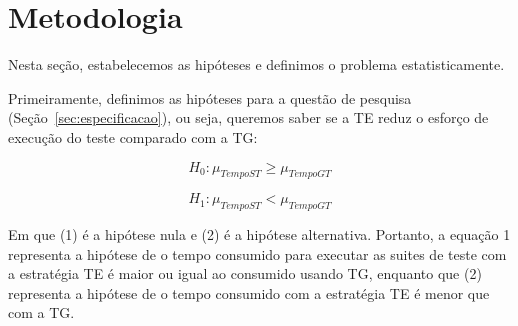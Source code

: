 \section{Metodologia}
\label{sec:metodologia}




Nesta seção, estabelecemos as hipóteses e definimos o problema estatisticamente.

Primeiramente, definimos as hipóteses para a questão de pesquisa (Seção~\ref{sec:especificacao}), ou seja, queremos saber se a TE reduz o esforço de execução do teste comparado com a TG:

\begin{equation}
	H_{0} : \mu_{TempoST} \geq \mu_{TempoGT}
\end{equation}

\begin{equation}
	H_{1} : \mu_{TempoST} < \mu_{TempoGT}
\end{equation}

Em que (1) é a hipótese nula e (2) é a hipótese alternativa. Portanto, a equação 1 representa a hipótese de o tempo consumido para executar as suites de teste com a estratégia TE é maior ou igual ao consumido usando TG, enquanto que (2) representa a hipótese de o tempo consumido com a estratégia TE é menor que com a TG.





